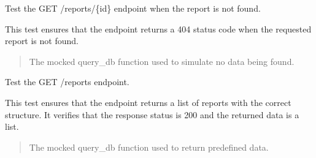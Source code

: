 \documentclass[letterpaper,10pt,english]{sphinxmanual}
\begin{document}

\begin{fulllineitems}
\label{\detokenize{test.my_fastapi:test.my_fastapi.test_main.test_get_report_not_found}}
\pysigstartsignatures
\pysiglinewithargsret
{}
{}
{}
\pysigstopsignatures
\sphinxAtStartPar
Test the GET /reports/\{id\} endpoint when the report is not found.

\sphinxAtStartPar
This test ensures that the endpoint returns a 404 status code when the requested report is not found.
\begin{quote}\begin{description}
\sphinxAtStartPar
{} \textendash{} The mocked query\_db function used to simulate no data being found.

\end{description}\end{quote}

\end{fulllineitems}


\begin{fulllineitems}
\label{\detokenize{test.my_fastapi:test.my_fastapi.test_main.test_get_reports}}
\pysigstartsignatures
\pysiglinewithargsret
{}
{}
{}
\pysigstopsignatures
\sphinxAtStartPar
Test the GET /reports endpoint.

\sphinxAtStartPar
This test ensures that the endpoint returns a list of reports with the correct structure.
It verifies that the response status is 200 and the returned data is a list.
\begin{quote}\begin{description}
\sphinxAtStartPar
{} \textendash{} The mocked query\_db function used to return predefined data.

\end{description}\end{quote}

\end{fulllineitems}
\end{document}
